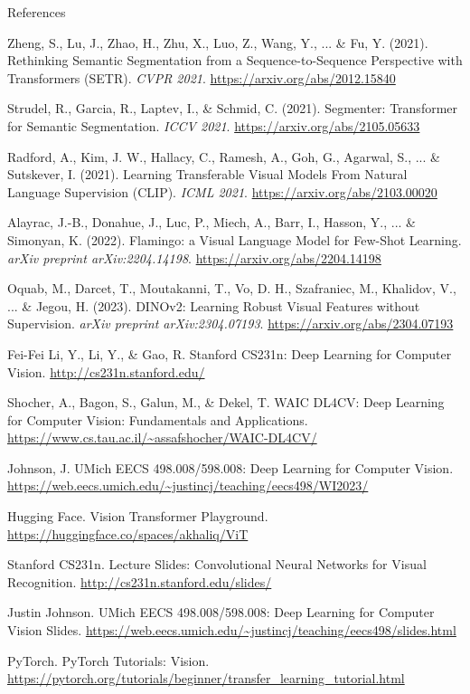 \begin{frame}[allowframebreaks]{References}
\begin{thebibliography}{99}
        Zheng, S., Lu, J., Zhao, H., Zhu, X., Luo, Z., Wang, Y., ... \& Fu, Y. (2021).
        Rethinking Semantic Segmentation from a Sequence-to-Sequence Perspective with Transformers (SETR).
        \emph{CVPR 2021}.
        \url{https://arxiv.org/abs/2012.15840}

        Strudel, R., Garcia, R., Laptev, I., \& Schmid, C. (2021).
        Segmenter: Transformer for Semantic Segmentation.
        \emph{ICCV 2021}.
        \url{https://arxiv.org/abs/2105.05633}

        Radford, A., Kim, J. W., Hallacy, C., Ramesh, A., Goh, G., Agarwal, S., ... \& Sutskever, I. (2021).
        Learning Transferable Visual Models From Natural Language Supervision (CLIP).
        \emph{ICML 2021}.
        \url{https://arxiv.org/abs/2103.00020}

        Alayrac, J.-B., Donahue, J., Luc, P., Miech, A., Barr, I., Hasson, Y., ... \& Simonyan, K. (2022).
        Flamingo: a Visual Language Model for Few-Shot Learning.
        \emph{arXiv preprint arXiv:2204.14198}.
        \url{https://arxiv.org/abs/2204.14198}

        Oquab, M., Darcet, T., Moutakanni, T., Vo, D. H., Szafraniec, M., Khalidov, V., ... \& Jegou, H. (2023).
        DINOv2: Learning Robust Visual Features without Supervision.
        \emph{arXiv preprint arXiv:2304.07193}.
        \url{https://arxiv.org/abs/2304.07193}

        Fei-Fei Li, Y., Li, Y., \& Gao, R.
        Stanford CS231n: Deep Learning for Computer Vision.
        \url{http://cs231n.stanford.edu/}

        Shocher, A., Bagon, S., Galun, M., \& Dekel, T.
        WAIC DL4CV: Deep Learning for Computer Vision: Fundamentals and Applications.
        \url{https://www.cs.tau.ac.il/~assafshocher/WAIC-DL4CV/}

        Johnson, J.
        UMich EECS 498.008/598.008: Deep Learning for Computer Vision.
        \url{https://web.eecs.umich.edu/~justincj/teaching/eecs498/WI2023/}

        Hugging Face.
        Vision Transformer Playground.
        \url{https://huggingface.co/spaces/akhaliq/ViT}

        Stanford CS231n.
        Lecture Slides: Convolutional Neural Networks for Visual Recognition.
        \url{http://cs231n.stanford.edu/slides/}

        Justin Johnson.
        UMich EECS 498.008/598.008: Deep Learning for Computer Vision Slides.
        \url{https://web.eecs.umich.edu/~justincj/teaching/eecs498/slides.html}

        PyTorch.
        PyTorch Tutorials: Vision.
        \url{https://pytorch.org/tutorials/beginner/transfer_learning_tutorial.html}
    \end{thebibliography}
\end{frame}